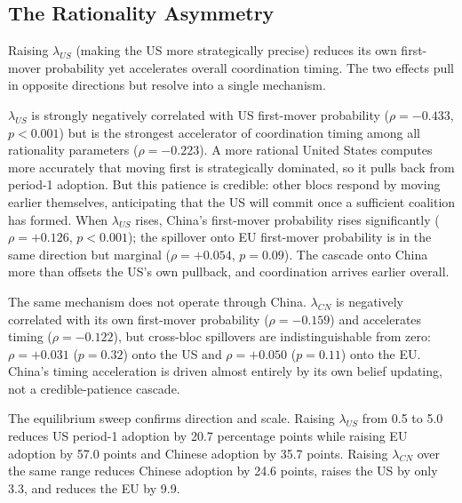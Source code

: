 \documentclass[10pt,a4paper]{article}
\begin{document}
\FloatBarrier

\FloatBarrier

\needspace{12em}
\subsection{The Rationality Asymmetry}

Raising $\lambda_{US}$ (making the US more strategically precise) reduces its own first-mover probability yet accelerates overall coordination timing. The two effects pull in opposite directions but resolve into a single mechanism.

\FloatBarrier

\FloatBarrier

$\lambda_{US}$ is strongly negatively correlated with US first-mover probability ($\rho = -0.433$, $p < 0.001$) but is the strongest accelerator of coordination timing among all rationality parameters ($\rho = -0.223$). A more rational United States computes more accurately that moving first is strategically dominated, so it pulls back from period-1 adoption. But this patience is credible: other blocs respond by moving earlier themselves, anticipating that the US will commit once a sufficient coalition has formed. When $\lambda_{US}$ rises, China's first-mover probability rises significantly ($\rho = +0.126$, $p < 0.001$); the spillover onto EU first-mover probability is in the same direction but marginal ($\rho = +0.054$, $p = 0.09$). The cascade onto China more than offsets the US's own pullback, and coordination arrives earlier overall.

The same mechanism does not operate through China. $\lambda_{CN}$ is negatively correlated with its own first-mover probability ($\rho = -0.159$) and accelerates timing ($\rho = -0.122$), but cross-bloc spillovers are indistinguishable from zero: $\rho = +0.031$ ($p = 0.32$) onto the US and $\rho = +0.050$ ($p = 0.11$) onto the EU. China's timing acceleration is driven almost entirely by its own belief updating, not a credible-patience cascade.

The equilibrium sweep confirms direction and scale. Raising $\lambda_{US}$ from 0.5 to 5.0 reduces US period-1 adoption by 20.7 percentage points while raising EU adoption by 57.0 points and Chinese adoption by 35.7 points. Raising $\lambda_{CN}$ over the same range reduces Chinese adoption by 24.6 points, raises the US by only 3.3, and reduces the EU by 9.9.
\end{document}
